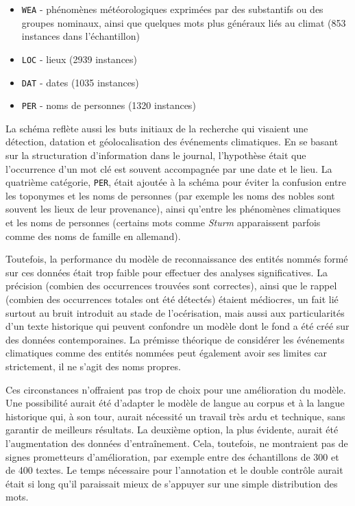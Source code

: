 \documentclass[a4paper,twoside,12pt]{article}
\begin{document}
\vspace{1ex}
\begin{itemize}[label=$\bullet$]
    \item \texttt{WEA} - phénomènes météorologiques exprimées par des substantifs ou des groupes nominaux, ainsi que quelques mots plus généraux liés au climat (853 instances dans l'échantillon) 
    \item \texttt{LOC} - lieux (2939 instances)
    \item \texttt{DAT} - dates (1035 instances)
    \item \texttt{PER} - noms de personnes (1320 instances)
\end{itemize}
\vspace{2ex}

La schéma reflète aussi les buts initiaux de la recherche qui visaient une détection, datation et géolocalisation des événements climatiques. En se basant sur la structuration d'information dans le journal, l'hypothèse était que l'occurrence d'un mot clé est souvent accompagnée par une date et le lieu. La quatrième catégorie, \texttt{PER}, était ajoutée à la schéma pour éviter la confusion entre les toponymes et les noms de personnes (par exemple les noms des nobles sont souvent les lieux de leur provenance), ainsi qu'entre les phénomènes climatiques et les noms de personnes (certains mots comme \textit{Sturm} apparaissent parfois comme des noms de famille en allemand).

Toutefois, la performance du modèle de reconnaissance des entités nommés formé sur ces données était trop faible pour effectuer des analyses significatives. La précision (combien des occurrences trouvées sont correctes), ainsi que le rappel (combien des occurrences totales ont été détectés) étaient médiocres, un fait lié surtout au bruit introduit au stade de l'océrisation, mais aussi aux particularités d'un texte historique qui peuvent confondre un modèle dont le fond a été créé sur des données contemporaines. La prémisse théorique de considérer les événements climatiques comme des entités nommées peut également avoir ses limites car strictement, il ne s'agit des noms propres.

Ces circonstances n'offraient pas trop de choix pour une amélioration du modèle. Une possibilité aurait été d'adapter le modèle de langue au corpus et à la langue historique qui, à son tour, aurait nécessité un travail très ardu et technique, sans garantir de meilleurs résultats. La deuxième option, la plus évidente, aurait été l'augmentation des données d'entraînement. Cela, toutefois, ne montraient pas de signes prometteurs d'amélioration, par exemple entre des échantillons de 300 et de 400 textes. Le temps nécessaire pour l'annotation et le double contrôle aurait était si long qu'il paraissait mieux de s'appuyer sur une simple distribution des mots.
\end{document}
